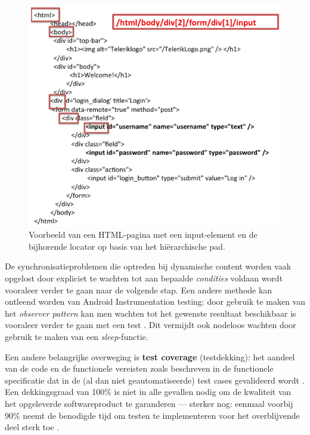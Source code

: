 \begin{figure}[h!]
    \centering
    \includegraphics[scale=0.5]{img/Holmes2020XPath.PNG}
    \caption{Voorbeeld van een HTML-pagina met een input-element en de bijhorende locator op basis van het hiërarchische pad. \autocite{Holmes2020}}
    \label{fig:holmesxpath}
\end{figure}

De synchronisatieproblemen die optreden bij dynamische content worden vaak opgelost door expliciet te wachten tot aan bepaalde \emph{condities} voldaan wordt vooraleer verder te gaan naar de volgende stap. Een andere methode kan ontleend worden van Android Instrumentation testing: door gebruik te maken van het \emph{observer pattern} kan men wachten tot het gewenste resultaat beschikbaar is vooraleer verder te gaan met een test \autocite{Elye2018}. Dit vermijdt ook nodeloos wachten door gebruik te maken van een \emph{sleep}-functie.

Een andere belangrijke overweging is \textbf{test coverage} (testdekking): het aandeel van de code en de functionele vereisten zoals beschreven in de functionele specificatie dat in de (al dan niet geautomatiseerde) test cases gevalideerd wordt \autocite{Sheth2019}. Een dekkingsgraad van 100\% is niet in alle gevallen nodig om de kwaliteit van het opgeleverde softwareproduct te garanderen — sterker nog: eenmaal voorbij 90\% neemt de benodigde tijd om testen te implementeren voor het overblijvende deel sterk toe \autocite{Prause2017}.

